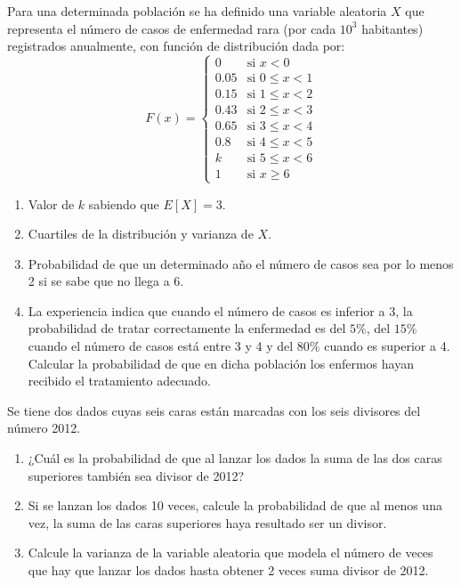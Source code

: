 \documentclass[12pt]{article}
\begin{document}
    \begin{ejercicio}
        Para una determinada población se ha definido una variable aleatoria $X$ que representa el número de casos de enfermedad rara (por cada $10^3$ habitantes) registrados anualmente, con función de distribución dada por:
        \[
        F(x) = \begin{cases}
            0 & \text{si } x < 0 \\
            0.05 & \text{si } 0 \leq x < 1 \\
            0.15 & \text{si } 1 \leq x < 2 \\
            0.43 & \text{si } 2 \leq x < 3 \\
            0.65 & \text{si } 3 \leq x < 4 \\
            0.8 & \text{si } 4 \leq x < 5 \\
            k & \text{si } 5 \leq x < 6 \\
            1 & \text{si } x \geq 6
        \end{cases}
        \]

        \begin{enumerate}[label=\alph*)]
            \item Valor de $k$ sabiendo que $E[X] = 3$.
            \item Cuartiles de la distribución y varianza de $X$.
            \item Probabilidad de que un determinado año el número de casos sea por lo menos 2 si se sabe que no llega a 6.
            \item La experiencia indica que cuando el número de casos es inferior a 3, la probabilidad de tratar correctamente la enfermedad es del $5\%$, del $15\%$ cuando el número de casos está entre 3 y 4 y del $80\%$ cuando es superior a 4. Calcular la probabilidad de que en dicha población los enfermos hayan recibido el tratamiento adecuado.
        \end{enumerate}
    \end{ejercicio}

    \begin{ejercicio}
        Se tiene dos dados cuyas seis caras están marcadas con los seis divisores del número 2012.

        \begin{enumerate}[label=\alph*)]
            \item ¿Cuál es la probabilidad de que al lanzar los dados la suma de las dos caras superiores también sea divisor de 2012?
            \item Si se lanzan los dados 10 veces, calcule la probabilidad de que al menos una vez, la suma de las caras superiores haya resultado ser un divisor.
            \item Calcule la varianza de la variable aleatoria que modela el número de veces que hay que lanzar los dados hasta obtener 2 veces suma divisor de 2012.
        \end{enumerate}
    \end{ejercicio}

    \newpage
    \setcounter{ejercicio}{0} %
    \noindent
\end{document}
